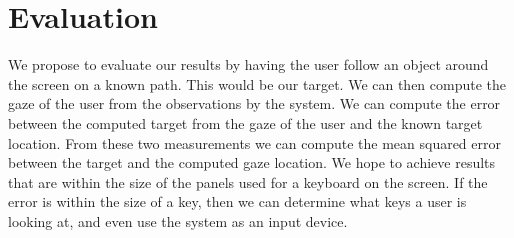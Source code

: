 \documentclass[10pt,twocolumn,letterpaper]{article}
\begin{document}
\section{Evaluation}
We propose to evaluate our results by having the user follow an object
around the screen on a known path. This would be our target. We can
then compute the gaze of the user from the observations by the
system. We can compute the error between the computed target from the
gaze of the user and the known target location. From these two
measurements we can compute the mean squared error between the target
and the computed gaze location. We hope to achieve results that are
within the size of the panels used for a keyboard on the screen. If
the error is within the size of a key, then we can determine what keys
a user is looking at, and even use the system as an input device.



{\small


}
\end{document}
